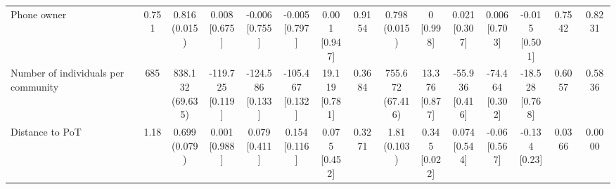 \documentclass[
]{article}
\begin{document}
\begin{table}[htbp]
{\begin{tabular}[t]{lcccccccccccccc}
\hspace{1em}Phone owner & 0.751 & \makecell[c]{0.816\\(0.015)} & \makecell[c]{0.008\\{[0.675]}} & \makecell[c]{-0.006\\{[0.755]}} & \makecell[c]{-0.005\\{[0.797]}} & \makecell[c]{0.001\\{[0.947]}} & 0.9154 & \makecell[c]{0.798\\(0.015)} & \makecell[c]{0\\{[0.998]}} & \makecell[c]{0.021\\{[0.307]}} & \makecell[c]{0.006\\{[0.703]}} & \makecell[c]{-0.015\\{[0.501]}} & 0.7542 & 0.8231\\
\hspace{1em}Number of individuals per community & 685 & \makecell[c]{838.132\\(69.635)} & \makecell[c]{-119.725\\{[0.119]}} & \makecell[c]{-124.586\\{[0.133]}} & \makecell[c]{-105.467\\{[0.132]}} & \makecell[c]{19.119\\{[0.781]}} & 0.3684 & \makecell[c]{755.672\\(67.416)} & \makecell[c]{13.376\\{[0.877]}} & \makecell[c]{-55.936\\{[0.416]}} & \makecell[c]{-74.464\\{[0.302]}} & \makecell[c]{-18.528\\{[0.768]}} & 0.6057 & 0.5836\\
\hspace{1em}Distance to PoT & 1.18 & \makecell[c]{0.699\\(0.079)} & \makecell[c]{0.001\\{[0.988]}} & \makecell[c]{0.079\\{[0.411]}} & \makecell[c]{0.154\\{[0.116]}} & \makecell[c]{0.075\\{[0.452]}} & 0.3271 & \makecell[c]{1.81\\(0.103)} & \makecell[c]{0.345\\{[0.022]}} & \makecell[c]{0.074\\{[0.544]}} & \makecell[c]{-0.06\\{[0.567]}} & \makecell[c]{-0.134\\{[0.23]}} & 0.0366 & 0.0000\\

\end{tabular}}
\end{table}
\end{document}
